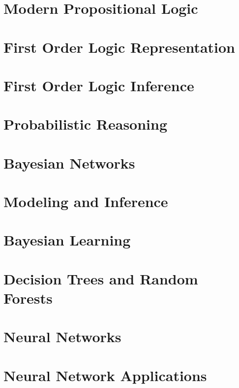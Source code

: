 \documentclass[9pt]{extarticle}
\begin{document}
\section{Modern Propositional Logic}

\newpage

\section{First Order Logic Representation}

\newpage

\section{First Order Logic Inference}

\newpage

\section{Probabilistic Reasoning}

\newpage

\section{Bayesian Networks}

\newpage

\section{Modeling and Inference}

\newpage

\section{Bayesian Learning}

\newpage

\section{Decision Trees and Random Forests}

\newpage

\section{Neural Networks}

\newpage

\section{Neural Network Applications}

\newpage
\end{document}
